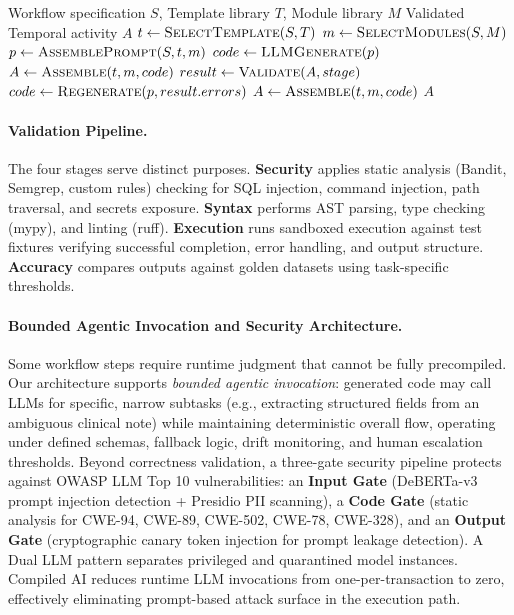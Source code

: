\documentclass[11pt]{article}
\begin{document}
\begin{algorithm}[ht]
\caption{Code Foundry Generation Process}
\label{alg:generation}
\begin{algorithmic}[1]
\Require Workflow specification $S$, Template library $T$, Module library $M$
\Ensure Validated Temporal activity $A$
\State $t \gets \textsc{SelectTemplate}(S, T)$
\State $m \gets \textsc{SelectModules}(S, M)$
\State $p \gets \textsc{AssemblePrompt}(S, t, m)$
\State $code \gets \textsc{LLMGenerate}(p)$ 
\State $A \gets \textsc{Assemble}(t, m, code)$
    \State $result \gets \textsc{Validate}(A, stage)$
        \State $code \gets \textsc{Regenerate}(p, result.errors)$
        \State $A \gets \textsc{Assemble}(t, m, code)$
    \EndIf
\EndFor
\State \Return $A$ 
\end{algorithmic}
\end{algorithm}

\paragraph{Validation Pipeline.} The four stages serve distinct purposes. \textbf{Security} applies static analysis (Bandit, Semgrep, custom rules) checking for SQL injection, command injection, path traversal, and secrets exposure. \textbf{Syntax} performs AST parsing, type checking (mypy), and linting (ruff). \textbf{Execution} runs sandboxed execution against test fixtures verifying successful completion, error handling, and output structure. \textbf{Accuracy} compares outputs against golden datasets using task-specific thresholds.

\paragraph{Bounded Agentic Invocation and Security Architecture.} Some workflow steps require runtime judgment that cannot be fully precompiled. Our architecture supports \textit{bounded agentic invocation}: generated code may call LLMs for specific, narrow subtasks (e.g., extracting structured fields from an ambiguous clinical note) while maintaining deterministic overall flow, operating under defined schemas, fallback logic, drift monitoring, and human escalation thresholds. Beyond correctness validation, a three-gate security pipeline protects against OWASP LLM Top 10 vulnerabilities: an \textbf{Input Gate} (DeBERTa-v3 prompt injection detection + Presidio PII scanning), a \textbf{Code Gate} (static analysis for CWE-94, CWE-89, CWE-502, CWE-78, CWE-328), and an \textbf{Output Gate} (cryptographic canary token injection for prompt leakage detection). A Dual LLM pattern separates privileged and quarantined model instances. Compiled AI reduces runtime LLM invocations from one-per-transaction to zero, effectively eliminating prompt-based attack surface in the execution path.
\end{document}
